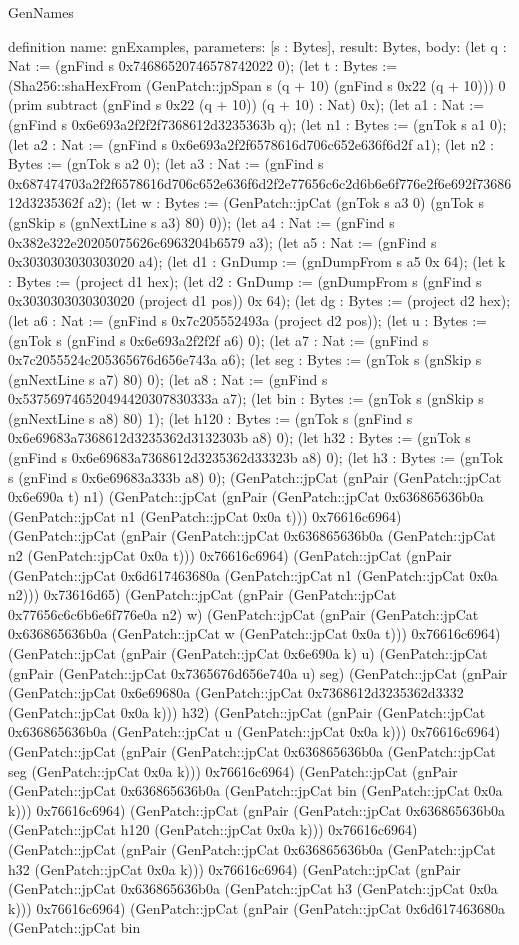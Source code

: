 \begin{lexlean}{GenNames}
\begin{semanticmodule}
definition{
  name: gnExamples,
  parameters: [s : Bytes],
  result: Bytes,
  body: (let q : Nat := (gnFind s 0x74686520746578742022 0); (let t : Bytes := (Sha256::shaHexFrom (GenPatch::jpSpan s (q + 10) (gnFind s 0x22 (q + 10))) 0 (prim subtract (gnFind s 0x22 (q + 10)) (q + 10) : Nat) 0x); (let a1 : Nat := (gnFind s 0x6e693a2f2f2f7368612d3235363b q); (let n1 : Bytes := (gnTok s a1 0); (let a2 : Nat := (gnFind s 0x6e693a2f2f6578616d706c652e636f6d2f a1); (let n2 : Bytes := (gnTok s a2 0); (let a3 : Nat := (gnFind s 0x687474703a2f2f6578616d706c652e636f6d2f2e77656c6c2d6b6e6f776e2f6e692f7368612d3235362f a2); (let w : Bytes := (GenPatch::jpCat (gnTok s a3 0) (gnTok s (gnSkip s (gnNextLine s a3) 80) 0)); (let a4 : Nat := (gnFind s 0x382e322e20205075626c6963204b6579 a3); (let a5 : Nat := (gnFind s 0x3030303030303020 a4); (let d1 : GnDump := (gnDumpFrom s a5 0x 64); (let k : Bytes := (project d1 hex); (let d2 : GnDump := (gnDumpFrom s (gnFind s 0x3030303030303020 (project d1 pos)) 0x 64); (let dg : Bytes := (project d2 hex); (let a6 : Nat := (gnFind s 0x7c205552493a (project d2 pos)); (let u : Bytes := (gnTok s (gnFind s 0x6e693a2f2f2f a6) 0); (let a7 : Nat := (gnFind s 0x7c2055524c205365676d656e743a a6); (let seg : Bytes := (gnTok s (gnSkip s (gnNextLine s a7) 80) 0); (let a8 : Nat := (gnFind s 0x537569746520494420307830333a a7); (let bin : Bytes := (gnTok s (gnSkip s (gnNextLine s a8) 80) 1); (let h120 : Bytes := (gnTok s (gnFind s 0x6e69683a7368612d3235362d3132303b a8) 0); (let h32 : Bytes := (gnTok s (gnFind s 0x6e69683a7368612d3235362d33323b a8) 0); (let h3 : Bytes := (gnTok s (gnFind s 0x6e69683a333b a8) 0); (GenPatch::jpCat (gnPair (GenPatch::jpCat 0x6e690a t) n1) (GenPatch::jpCat (gnPair (GenPatch::jpCat 0x636865636b0a (GenPatch::jpCat n1 (GenPatch::jpCat 0x0a t))) 0x76616c6964) (GenPatch::jpCat (gnPair (GenPatch::jpCat 0x636865636b0a (GenPatch::jpCat n2 (GenPatch::jpCat 0x0a t))) 0x76616c6964) (GenPatch::jpCat (gnPair (GenPatch::jpCat 0x6d617463680a (GenPatch::jpCat n1 (GenPatch::jpCat 0x0a n2))) 0x73616d65) (GenPatch::jpCat (gnPair (GenPatch::jpCat 0x77656c6c6b6e6f776e0a n2) w) (GenPatch::jpCat (gnPair (GenPatch::jpCat 0x636865636b0a (GenPatch::jpCat w (GenPatch::jpCat 0x0a t))) 0x76616c6964) (GenPatch::jpCat (gnPair (GenPatch::jpCat 0x6e690a k) u) (GenPatch::jpCat (gnPair (GenPatch::jpCat 0x7365676d656e740a u) seg) (GenPatch::jpCat (gnPair (GenPatch::jpCat 0x6e69680a (GenPatch::jpCat 0x7368612d3235362d3332 (GenPatch::jpCat 0x0a k))) h32) (GenPatch::jpCat (gnPair (GenPatch::jpCat 0x636865636b0a (GenPatch::jpCat u (GenPatch::jpCat 0x0a k))) 0x76616c6964) (GenPatch::jpCat (gnPair (GenPatch::jpCat 0x636865636b0a (GenPatch::jpCat seg (GenPatch::jpCat 0x0a k))) 0x76616c6964) (GenPatch::jpCat (gnPair (GenPatch::jpCat 0x636865636b0a (GenPatch::jpCat bin (GenPatch::jpCat 0x0a k))) 0x76616c6964) (GenPatch::jpCat (gnPair (GenPatch::jpCat 0x636865636b0a (GenPatch::jpCat h120 (GenPatch::jpCat 0x0a k))) 0x76616c6964) (GenPatch::jpCat (gnPair (GenPatch::jpCat 0x636865636b0a (GenPatch::jpCat h32 (GenPatch::jpCat 0x0a k))) 0x76616c6964) (GenPatch::jpCat (gnPair (GenPatch::jpCat 0x636865636b0a (GenPatch::jpCat h3 (GenPatch::jpCat 0x0a k))) 0x76616c6964) (GenPatch::jpCat (gnPair (GenPatch::jpCat 0x6d617463680a (GenPatch::jpCat bin }
\end{semanticmodule}
\end{lexlean}
